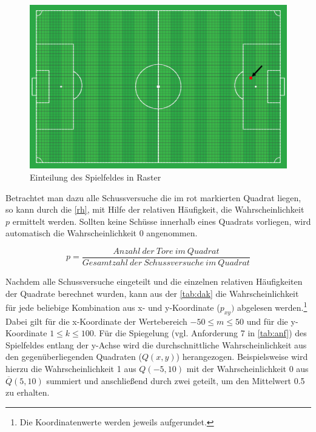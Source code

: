 \begin{figure}[H]
\centering
\includegraphics[scale=0.28]{se-wa-jpg/raster}
\caption[Einteilung des Spielfeldes in Raster]{Einteilung des Spielfeldes in Raster}
\label{raster}
\end{figure}

Betrachtet man dazu alle Schussversuche die im rot markierten Quadrat liegen, so kann durch die \vref{rh}, mit Hilfe der relativen Häufigkeit, die Wahrscheinlichkeit $p$ ermittelt werden. Sollten keine Schüsse innerhalb eines Quadrats vorliegen, wird automatisch die Wahrscheinlichkeit 0 angenommen.

\begin{equation}
p = \frac{Anzahl~der~Tore~im~Quadrat}{Gesamtzahl~der~Schussversuche~im~Quadrat}
\label{rh}
\end{equation}

Nachdem alle Schussversuche eingeteilt und die einzelnen relativen Häufigkeiten der Quadrate berechnet wurden, kann aus der \vref{tab:dak} die Wahrscheinlichkeit für jede beliebige Kombination aus x- und y-Koordinate ($p_{xy})$ abgelesen werden.\footnote{Die Koordinatenwerte werden jeweils aufgerundet.} Dabei gilt für die x-Koordinate der Wertebereich $-50 \le m \le 50$ und für die y-Koordinate $1 \le k \le 100$. Für die Spiegelung (vgl. Anforderung 7 in \vref{tab:anf}) des Spielfeldes entlang der y-Achse wird die durchschnittliche Wahrscheinlichkeit aus den gegenüberliegenden Quadraten ($Q(x,y)$) herangezogen. Beispielsweise wird hierzu die Wahrscheinlichkeit \textsf{1} aus $Q(-5,10)$ mit der Wahrscheinlichkeit \textsf{0} aus $\overline{Q}(5,10)$ summiert und anschließend durch zwei geteilt, um den Mittelwert \textsf{0.5} zu erhalten. 


